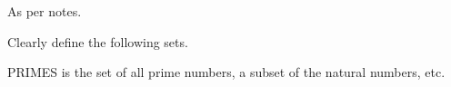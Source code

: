 \documentclass[a4paper, 12pt]{exam}
\begin{document}
\begin{questions}
  \begin{solution}
    As per notes.
  \end{solution}


\question
  Clearly define the following sets.
  \begin{solution}
    PRIMES is the set of all prime numbers, a subset of the natural numbers, etc.
  \end{solution}



\end{questions}
\end{document}
